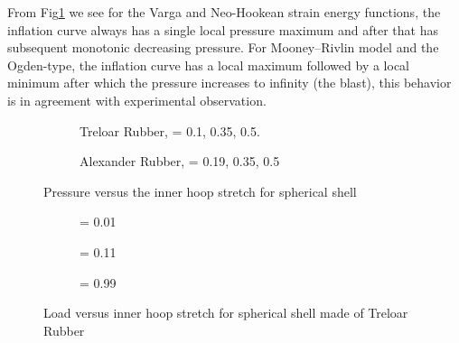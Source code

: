 \documentclass[12pt]{report}
\begin{document}
From Fig\ref{Fig1.3} we see for the Varga and Neo-Hookean strain energy functions, the inflation curve always has a single local pressure maximum and after that has subsequent
monotonic decreasing pressure. For Mooney–Rivlin model and the Ogden-type, the
inflation curve has a local maximum followed by a local minimum after which the
pressure increases to infinity (the blast), this behavior is in agreement with experimental observation\cite{snap}.

\begin{figure}[!ht]\label{Fig1.3}
	\centering
	\begin{subfigure}{0.45\textwidth}
			\centering
			\caption{Treloar Rubber, \eta = 0.1, 0.35, 0.5.}
		\end{subfigure}
		\begin{subfigure}{0.45\textwidth}
			\centering
			\caption{Alexander Rubber, \eta = 0.19, 0.35, 0.5 }
		\end{subfigure}
	\caption{Pressure versus the inner hoop stretch for spherical shell\cite{snap}}
	\centering
	\label{Fig1.3}
\end{figure}


\begin{figure}[!ht]\label{Fig1.4}
	\centering
	\begin{subfigure}{0.45\textwidth}
			\centering
			\setlength{\fboxrule}{2pt}
			\caption{\eta = 0.01}
		\end{subfigure}
		\hfill
		\begin{subfigure}{0.45\textwidth}
			\centering
			\setlength{\fboxrule}{2pt}
			\caption{\eta = 0.11 }
		\end{subfigure}
		\begin{subfigure}{0.45\textwidth}
			\centering
			\setlength{\fboxrule}{2pt}
			\caption{\eta = 0.99 }
		\end{subfigure}
	\caption{Load versus inner hoop stretch for spherical shell made of Treloar Rubber }
	\centering
	\label{Fig1.4}
\end{figure}
\end{document}
